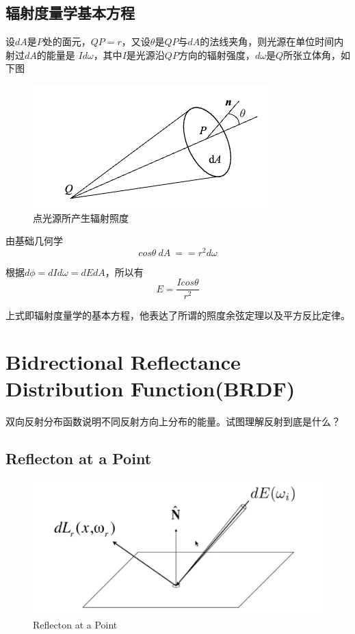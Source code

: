 \subsection*{辐射度量学基本方程}

设$dA$是$P$处的面元，$QP=r$，又设$\theta$是$QP$与$dA$的法线夹角，则光源在单位时间内射过$dA$的能量是
$Id\omega$，其中$I$是光源沿$QP$方向的辐射强度，$d\omega$是$Q$所张立体角，如下图

\begin{figure}[H]
    \centering
    \includegraphics[scale=0.5]{figures/点光源所产生辐射照度.png}
    \caption{点光源所产生辐射照度}
\end{figure}

由基础几何学
\begin{equation}
    cos\theta\ dA\ == r^2d\omega
\end{equation}

根据$d\phi=dId\omega=dEdA$，所以有
\begin{equation}
    E=\frac{Icos\theta}{r^2}
\end{equation}

上式即辐射度量学的基本方程，他表达了所谓的照度余弦定理以及平方反比定律。

\section{Bidrectional Reflectance Distribution Function(BRDF)}

双向反射分布函数说明不同反射方向上分布的能量。试图理解反射到底是什么？

\subsection*{Reflecton at a Point}
\begin{figure}[H]
    \centering
    \includegraphics[scale=0.5]{figures/反射点.png}
    \caption{Reflecton at a Point}
\end{figure}

